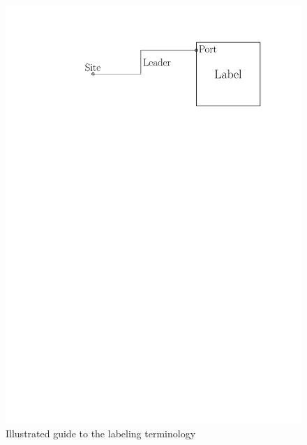 \documentclass[11pt,a4paper]{article}
\begin{document}
\begin{figure}
 \captionsetup{justification=centering, margin=0.75cm}
 \raggedleft
  \includegraphics[scale=0.5]{IPE_TerminologyDrawing.pdf}
  \caption{Illustrated guide to the labeling terminology}
 \label{fig:term}
\end{figure}
\end{document}
